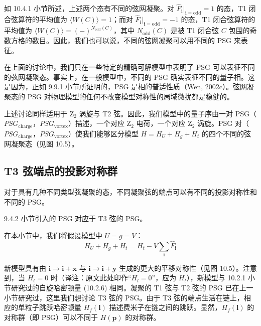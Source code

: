 如 10.4.1 小节所述，上述两个态有不同的弦网凝聚。对 $\hat F_{\pmb{i}}\big|_{\pmb{i}=\mathrm{odd}}=1$ 的态，T1 闭合弦算符的平均值为 $\langle W(C)\rangle=1$；而对 $\hat F_{\pmb{i}}\big|_{\pmb{i}=\mathrm{odd}}=-1$ 的态，T1 闭合弦算符的平均值为 $\langle W(C)\rangle=(-)^{N_{\mathrm{odd}}(C)}$，其中 $N_{\mathrm{odd}}(C)$ 是被 T1 闭合弦 $C$ 包围的奇数方格的数目。因此，我们也可以说，不同的弦网凝聚可以用不同的 PSG 来表征。

在上面的讨论中，我们只在一些特定的精确可解模型中表明了 PSG 可以表征不同的弦网凝聚态。事实上，在一般模型中，不同的 PSG 确实表征不同的量子相。这是因为，正如 9.9.1 小节所证明的，PSG 是相的普适性质（Wen, 2002c）。弦网凝聚态的 PSG 对物理模型的任何不改变模型对称性的局域微扰都是稳健的。

上述讨论同样适用于 Z$_2$ 涡旋与 T2 弦。因此，我们模型中的量子序由一对 PSG（$PSG_{\mathrm{charge}}$，$PSG_{\mathrm{vortex}}$）描述，一个对应 Z$_2$ 电荷，一个对应 Z$_2$ 涡旋。PSG 对（$PSG_{\mathrm{charge}}$，$PSG_{\mathrm{vortex}}$）使我们能够区分模型 $H=H_U+H_g+H_t$ 的四个不同的弦网凝聚态（见图 10.5）。

\subsection{T3 弦端点的投影对称群}

\begin{keypoints}\item 对于具有几种不同类型弦凝聚的态，不同凝聚弦的端点可以有不同的投影对称性和不同的 PSG。\end{keypoints}


\begin{keypoints}\item 9.4.2 小节引入的 PSG 对应于 T3 弦的 PSG。\end{keypoints}

在本小节中，我们将假设模型中 $U=g=V$：
\begin{equation*}
H_U+H_g+H_t=H_t-V\sum_{\pmb{i}}\hat F_{\pmb{i}}\tag{10.4.5}
\end{equation*}

新模型具有由 $\pmb{i}\to\pmb{i}+\pmb{x}$ 与 $\pmb{i}\to\pmb{i}+\pmb{y}$ 生成的更大的平移对称性（见图 10.5）。注意到，当 $H_t=0$ 时（译注：原文此处印作“$H_l=0$”，应为 $H_t$），新模型与 10.2.1 小节研究过的自旋哈密顿量 (10.2.6) 相同。凝聚的 T1 弦与 T2 弦的 PSG 已在上一小节研究过，这里我们想讨论 T3 弦的 PSG。由于 T3 弦的端点生活在链上，相应的单粒子跳跃哈密顿量 $H_f(\pmb{l})$ 描述费米子在链之间的跳跃。显然，$H_f(\pmb{l})$ 的对称群（即 PSG）可以不同于 $H(\pmb{p})$ 的对称群。

